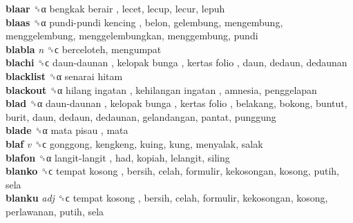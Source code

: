 \textbf{blaar} ␝α   bengkak berair , lecet, lecup, lecur, lepuh  \\
\textbf{blaas} ␝α   pundi-pundi kencing , belon, gelembung, mengembung, menggelembung, menggelembungkan, menggembung, pundi  \\
\textbf{blabla} \emph{n}  ␝ϲ  berceloteh, mengumpat  \\
\textbf{blachi} ␝ϲ   daun-daunan ,  kelopak bunga ,  kertas folio , daun, dedaun, dedaunan  \\
\textbf{blacklist} ␝α   senarai hitam   \\
\textbf{blackout} ␝α   hilang ingatan ,  kehilangan ingatan , amnesia, penggelapan  \\
\textbf{blad} ␝α   daun-daunan ,  kelopak bunga ,  kertas folio , belakang, bokong, buntut, burit, daun, dedaun, dedaunan, gelandangan, pantat, punggung  \\
\textbf{blade} ␝α   mata pisau , mata  \\
\textbf{blaf} \emph{v}  ␝ϲ  gonggong, kengkeng, kuing, kung, menyalak, salak  \\
\textbf{blafon} ␝α   langit-langit , had, kopiah, lelangit, siling  \\
\textbf{blanko} ␝ϲ   tempat kosong , bersih, celah, formulir, kekosongan, kosong, putih, sela  \\
\textbf{blanku} \emph{adj}  ␝ϲ   tempat kosong , bersih, celah, formulir, kekosongan, kosong, perlawanan, putih, sela  \\
